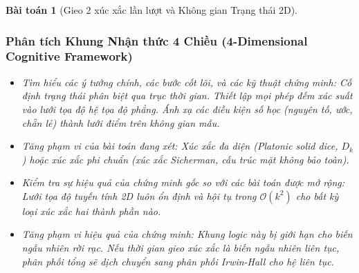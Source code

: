 \documentclass{article}
\newtheorem{baitoan}{Bài toán}
\begin{document}
\begin{baitoan}[Gieo 2 xúc xắc lần lượt và Không gian Trạng thái 2D]
 \subsubsection*{Phân tích Khung Nhận thức 4 Chiều (4-Dimensional Cognitive Framework)}
 \begin{itemize}
 \item \textit{Tìm hiểu các ý tưởng chính, các bước cốt lõi, và các kỹ thuật chứng minh}: Cố định trạng thái phân biệt qua trục thời gian. Thiết lập mọi phép đếm xác suất vào lưới tọa độ hệ tọa độ phẳng. Ánh xạ các điều kiện số học (nguyên tố, ước, chẵn lẻ) thành lưới điểm trên không gian mẫu.
 \item \textit{Tăng phạm vi của bài toán đang xét}: Xúc xắc đa diện (Platonic solid dice, $D_k$) hoặc xúc xắc phi chuẩn (xúc xắc Sicherman, cấu trúc mặt không bảo toàn).
 \item \textit{Kiểm tra sự hiệu quả của chứng minh gốc so với các bài toán được mở rộng}: Lưới tọa độ tuyến tính 2D luôn ổn định và hội tụ trong $\mathcal{O}(k^2)$ cho bất kỳ loại xúc xắc hai thành phần nào.
 \item \textit{Tăng phạm vi hiệu quả của chứng minh}: Khung logic này bị giới hạn cho biến ngẫu nhiên rời rạc. Nếu thời gian gieo xúc xắc là biến ngẫu nhiên liên tục, phân phối tổng sẽ dịch chuyển sang phân phối Irwin-Hall cho hệ liên tục.
 
  \end{itemize}
\end{baitoan}

\end{document}
